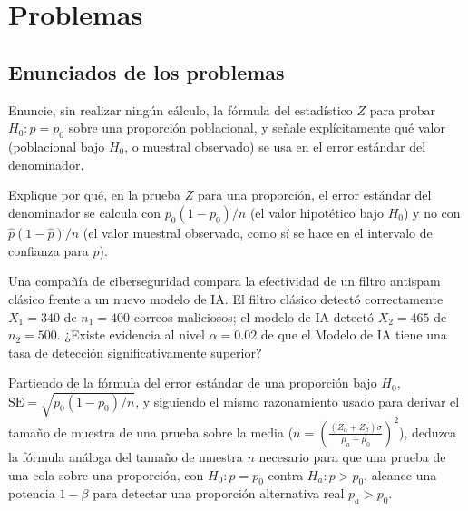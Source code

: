 \section*{Problemas}

\subsection*{Enunciados de los problemas}

\begin{problema}
	\label{prob:9667d45}
	Enuncie, sin realizar ningún cálculo, la fórmula del estadístico $Z$ para probar $H_0:p=p_0$ sobre una proporción poblacional, y señale explícitamente qué valor (poblacional bajo $H_0$, o muestral observado) se usa en el error estándar del denominador.
\end{problema}

\begin{problema}
	\label{prob:fa8ecc5}
	Explique por qué, en la prueba $Z$ para una proporción, el error estándar del denominador se calcula con $p_0(1-p_0)/n$ (el valor hipotético bajo $H_0$) y no con $\hat p(1-\hat p)/n$ (el valor muestral observado, como sí se hace en el intervalo de confianza para $p$).
\end{problema}

\begin{problema}
	\label{prob:7649a34}
	Una compañía de ciberseguridad compara la efectividad de un filtro antispam clásico frente a un nuevo modelo de IA. El filtro clásico detectó correctamente $X_1=340$ de $n_1=400$ correos maliciosos; el modelo de IA detectó $X_2=465$ de $n_2=500$. ¿Existe evidencia al nivel $\alpha=0.02$ de que el Modelo de IA tiene una tasa de detección significativamente superior?
\end{problema}

\begin{problema}
	\label{prob:451f58f}
	Partiendo de la fórmula del error estándar de una proporción bajo $H_0$, $\text{SE}=\sqrt{p_0(1-p_0)/n}$, y siguiendo el mismo razonamiento usado para derivar el tamaño de muestra de una prueba sobre la media ($n=\left(\frac{(Z_\alpha+Z_\beta)\sigma}{\mu_a-\mu_0}\right)^2$), deduzca la fórmula análoga del tamaño de muestra $n$ necesario para que una prueba de una cola sobre una proporción, con $H_0:p=p_0$ contra $H_a:p>p_0$, alcance una potencia $1-\beta$ para detectar una proporción alternativa real $p_a>p_0$.
\end{problema}

